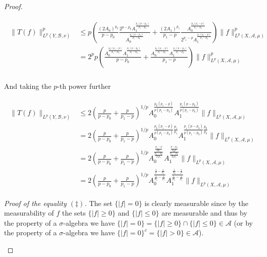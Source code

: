 \begin{proof}
\begin{enumerate}[label = \textbf{(\roman*.)}]
\begin{enumerate}[label = \textbf{\alph*.}]
		\begin{gather}
			\begin{aligned}
				\|T(f)\|_{L^p(Y,\mathcal{B},\nu)}^p &\leqslant p\left( \frac{(2A_0)^{p_0}}{p - p_0}\frac{2^{p - p_0}A_1^\frac{p_1(p-p_0)}{p_1-p_0}}{A_0^\frac{p_0(p-p_0)}{p_1 - p_0}} + \frac{(2A_1)^{p_1}}{p_1 - p} \frac{A_0^\frac{p_0(p_1 - p)}{p_1 - p_0}}{2^{p_1 - p}A_1^\frac{p_1(p_1 - p)}{p_1 - p_0}} \right)\|f\|_{L^p(X,\mathcal{A},\mu)}^p\\
				&=  2^pp\left( \frac{A_0^\frac{p_0(p_1 - p)}{p_1 - p_0}A_1^\frac{p_1(p-p_0)}{p_1-p_0}}{p - p_0} + \frac{A_0^\frac{p_0(p_1 - p)}{p_1 - p_0}A_1^\frac{p_1(p - p_0)}{p_1 - p_0}}{p_1- p} \right)\|f\|_{L^p(X,\mathcal{A},\mu)}^p\\
			\end{aligned}
		\end{gather}

		And taking the $p$-th power further

		\begin{gather}
			\begin{aligned}
				\|T(f)\|_{L^p(Y,\mathcal{B},\nu)} &\leqslant 2\left( \frac{p}{p - p_0} + \frac{p}{p_1- p} \right)^{1/p} A_0^\frac{p_0(p_1 - p)}{p(p_1 - p_0)}A_1^\frac{p_1(p - p_0)}{p(p_1 - p_0)}\|f\|_{L^p(X,\mathcal{A},\mu)}\\
				&= 2\left( \frac{p}{p - p_0} + \frac{p}{p_1- p} \right)^{1/p} A_0^{\frac{p_0(p_1 - p)}{p(p_1 - p_0)}\frac{p_1}{p_1}}A_1^{\frac{p_1(p - p_0)}{p(p_1 - p_0)}\frac{p_0}{p_0}}\|f\|_{L^p(X,\mathcal{A},\mu)}\\
				&= 2\left( \frac{p}{p - p_0} + \frac{p}{p_1- p} \right)^{1/p} A_0^{\frac{\frac{p_1 - p}{pp_1}}{\frac{p_1 - p_0}{p_0p_1}}}A_1^{\frac{\frac{p - p_0}{p_0p}}{\frac{p_1 - p_0}{p_0p_1}}}\|f\|_{L^p(X,\mathcal{A},\mu)}\\
				&= 2\left( \frac{p}{p - p_0} + \frac{p}{p_1- p} \right)^{1/p} A_0^{\frac{\frac{1}{p} - \frac{1}{p_1}}{\frac{1}{p_0} - \frac{1}{p_1}}}A_1^{\frac{\frac{1}{p_0} - \frac{1}{p}}{\frac{1}{p_0} - \frac{1}{p_1}}}\|f\|_{L^p(X,\mathcal{A},\mu)}
			\end{aligned}
		\end{gather}

		\emph{Proof of the equality $(\ddagger)$.} The set $\{\vert f \vert = 0\}$ is clearly measurable since by the measurability of $f$ the sets $\{\vert f \vert \geqslant 0\}$ and $\{\vert f \vert \leqslant 0\}$ are measurable and thus by the property of a $\sigma$-algebra we have $\{\vert f \vert = 0\} = \{\vert f \vert \geqslant 0\} \cap \{\vert f \vert \leqslant 0\} \in \mathcal{A}$ (or by the property of a $\sigma$-algebra we have $\{\vert f\vert = 0\}^c = \{\vert f\vert > 0\} \in \mathcal{A}$).
	\end{enumerate}
	

\end{enumerate}
\end{proof}
